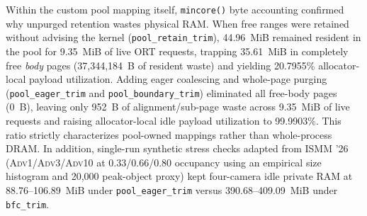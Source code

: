 \documentclass[sigconf,screen,nonacm]{acmart}
\begin{document}
Within the custom pool mapping itself, \texttt{mincore()} byte accounting confirmed why unpurged retention wastes physical RAM. When free ranges were retained without advising the kernel (\texttt{pool\_\allowbreak retain\_\allowbreak trim}), 44.96~MiB remained resident in the pool for 9.35~MiB of live ORT requests, trapping 35.61~MiB in completely free \textit{body} pages (37,344,184~B of resident waste) and yielding 20.7955\% allocator-local payload utilization. Adding eager coalescing and whole-page purging (\texttt{pool\_\allowbreak eager\_\allowbreak trim} and \texttt{pool\_\allowbreak boundary\_\allowbreak trim}) eliminated all free-body pages (0~B), leaving only 952~B of alignment/sub-page waste across 9.35~MiB of live requests and raising allocator-local idle payload utilization to 99.9903\%. This ratio strictly characterizes pool-owned mappings rather than whole-process DRAM. In addition, single-run synthetic stress checks adapted from ISMM '26 (\textsc{Adv1}/\textsc{Adv3}/\textsc{Adv10} at 0.33/0.66/0.80 occupancy using an empirical size histogram and 20,000 peak-object proxy) kept four-camera idle private RAM at 88.76--106.89~MiB under \texttt{pool\_\allowbreak eager\_\allowbreak trim} versus 390.68--409.09~MiB under \texttt{bfc\_\allowbreak trim}.
\end{document}
